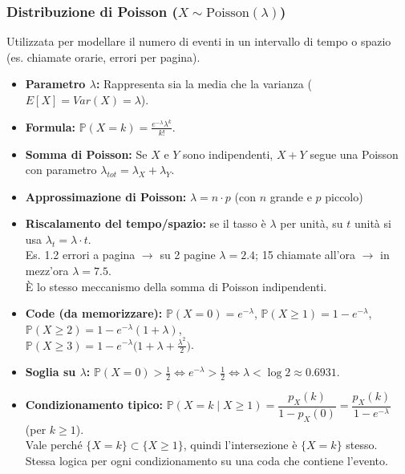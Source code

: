 \documentclass[12pt]{extarticle} %
\begin{document}
\subsubsection{Distribuzione di Poisson ($X \sim \text{Poisson}(\lambda)$)}
Utilizzata per modellare il numero di eventi in un intervallo di tempo o spazio (es. chiamate orarie, errori per pagina).
\begin{itemize}
    \item \textbf{Parametro $\lambda$:} Rappresenta sia la media che la varianza ($E[X] = Var(X) = \lambda$).
    \item \textbf{Formula:} $\mathbb{P}(X=k) = \frac{e^{-\lambda} \lambda^k}{k!}$.
    \item \textbf{Somma di Poisson:} Se $X$ e $Y$ sono indipendenti, $X+Y$ segue una Poisson con parametro $\lambda_{tot} = \lambda_X + \lambda_Y$.
    \item \textbf{Approssimazione di Poisson:} $\lambda = n \cdot p$ (con $n$ grande e $p$ piccolo)
    \item \textbf{Riscalamento del tempo/spazio:} se il tasso è $\lambda$ per unità, su $t$ unità si usa $\lambda_t = \lambda \cdot t$. \\ {\footnotesize Es. 1.2 errori a pagina $\to$ su 2 pagine $\lambda = 2.4$; 15 chiamate all'ora $\to$ in mezz'ora $\lambda = 7.5$. \\ È lo stesso meccanismo della somma di Poisson indipendenti.}
    \item \textbf{Code (da memorizzare):} $\mathbb{P}(X = 0) = e^{-\lambda}$, \; $\mathbb{P}(X \ge 1) = 1 - e^{-\lambda}$, \; $\mathbb{P}(X \ge 2) = 1 - e^{-\lambda}(1+\lambda)$, \\ $\mathbb{P}(X \ge 3) = 1 - e^{-\lambda}\big(1 + \lambda + \frac{\lambda^2}{2}\big)$.
    \item \textbf{Soglia su $\lambda$:} $\mathbb{P}(X=0) > \frac12 \iff e^{-\lambda} > \frac12 \iff \lambda < \log 2 \approx 0.6931$.
    \item \textbf{Condizionamento tipico:} \; $\mathbb{P}(X = k \mid X \ge 1) = \dfrac{p_X(k)}{1 - p_X(0)} = \dfrac{p_X(k)}{1 - e^{-\lambda}}$ \; (per $k \ge 1$). \\ {\footnotesize Vale perché $\{X=k\} \subset \{X \ge 1\}$, quindi l'intersezione è $\{X=k\}$ stesso. Stessa logica per ogni condizionamento su una coda che contiene l'evento.}
\end{itemize}
\end{document}
